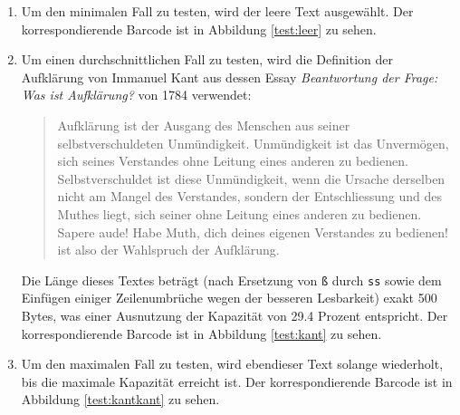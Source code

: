 \documentclass[11pt]{scrreprt} %
\theoremstyle{definition}
\begin{document}
\begin{enumerate}
\item Um den minimalen Fall zu testen, wird der leere Text ausgewählt. Der korrespondierende Barcode ist in Abbildung \ref{test:leer} zu sehen.
\item Um einen durchschnittlichen Fall zu testen, wird die Definition der Aufklärung von Immanuel Kant aus dessen Essay {\it Beantwortung der Frage: Was ist Aufklärung?} von 1784 \cite{kant} verwendet:

\begin{quote}
Aufklärung ist der Ausgang des Menschen aus seiner selbstverschuldeten Unmündigkeit. Unmündigkeit ist das Unvermögen, sich seines Verstandes ohne Leitung eines anderen zu bedienen. Selbstverschuldet ist diese Unmündigkeit, wenn die Ursache derselben nicht am Mangel des Verstandes, sondern der Entschliessung und des Muthes liegt, sich seiner ohne Leitung eines anderen zu bedienen. Sapere aude! Habe Muth, dich deines eigenen Verstandes zu bedienen! ist also der Wahlspruch der Aufklärung. \cite{wiki:kant}

\end{quote}
Die Länge dieses Textes beträgt (nach Ersetzung von {\tt ß} durch {\tt ss} sowie dem Einfügen einiger Zeilenumbrüche wegen der besseren Lesbarkeit) exakt 500 Bytes, was einer Ausnutzung der Kapazität von 29.4 Prozent entspricht. Der korrespondierende Barcode ist in Abbildung \ref{test:kant} zu sehen.

\item Um den maximalen Fall zu testen, wird ebendieser Text solange wiederholt, bis die maximale Kapazität erreicht ist. Der korrespondierende Barcode ist in Abbildung \ref{test:kantkant} zu sehen.


\end{enumerate}
\end{document}
